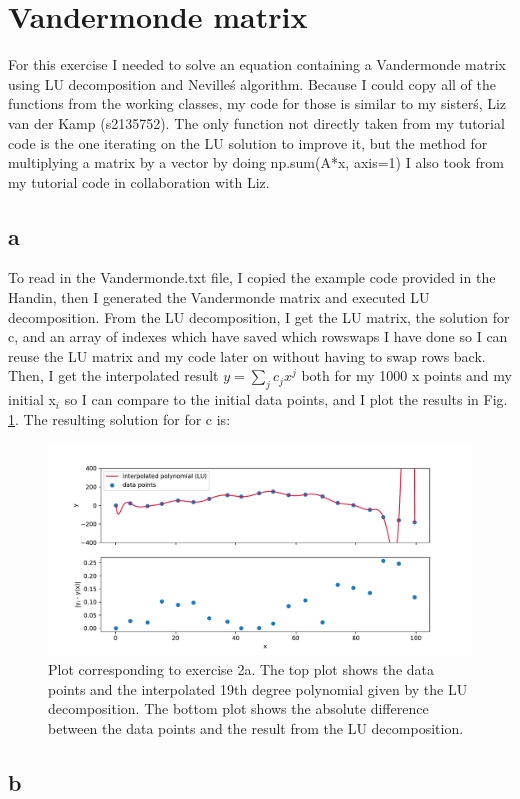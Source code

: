 \section{Vandermonde matrix}

For this exercise I needed to solve an equation containing a Vandermonde matrix using LU decomposition and Neville\'s algorithm.
Because I could copy all of the functions from the working classes, 
my code for those is similar to my sister\'s, Liz van der Kamp (s2135752). 
The only function not directly taken from my tutorial code is the one iterating on the LU solution to improve it, 
but the method for multiplying a matrix by a vector by doing np.sum(A*x, axis=1) I also took from my tutorial code in collaboration with Liz.

\subsection{a}
To read in the Vandermonde.txt file, I copied the example code provided in the Handin, 
then I generated the Vandermonde matrix and executed LU decomposition.
From the LU decomposition, I get the LU matrix, the solution for c, 
and an array of indexes which have saved which rowswaps I have done so I can reuse the LU matrix and my code later on without having to swap rows back.
Then, I get the interpolated result $y = \sum_j c_j x^j$ both for my 1000 x points and my initial x$_i$ so I can compare to the initial data points, 
and I plot the results in Fig. \ref{fig:fig1}.
The resulting solution for for c is:


\begin{figure}[h!]
  \centering
  \includegraphics[width=0.9\linewidth]{./NUR1_Q2_plot1.pdf}
  \caption{Plot corresponding to exercise 2a. The top plot shows the data points 
  and the interpolated 19th degree polynomial given by the LU decomposition. The bottom plot shows the absolute difference between
  the data points and the result from the LU decomposition.}
  \label{fig:fig1}
\end{figure} 

\subsection{b}
